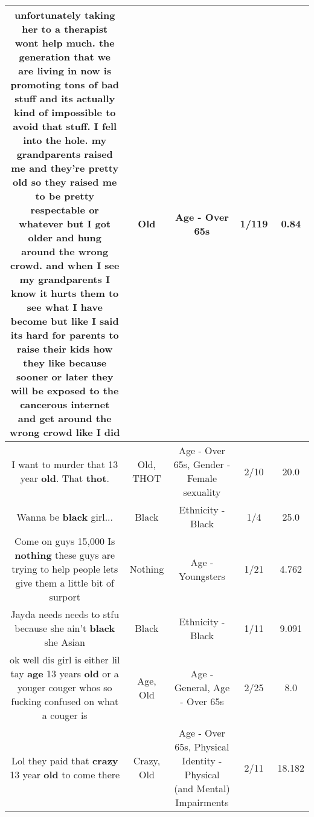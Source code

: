 \documentclass[11pt]{article}
\newlength\mylength
\begin{document}
\begin{center}
\begin{longtable}{|C{.65\mylength}|C{.30\mylength}|C{.12\mylength}|C{.12\mylength}|C{.12\mylength}|}
  \small unfortunately taking her to a therapist wont help much. the generation that we are living in now is promoting tons of bad stuff and its actually kind of impossible to avoid that stuff. I fell into the hole. my grandparents raised me and they're pretty \textbf{old} so they raised me to be pretty respectable or whatever but I got older and hung around the wrong crowd. and when I see my grandparents I know it hurts them to see what I have become but like I said its hard for parents to raise their kids how they like because sooner or later they will be exposed to the cancerous internet and get around the wrong crowd like I did\normalsize   & Old & Age - Over 65s & 1/119 & 0.84 \\  \hline
  \small I want to murder that 13 year \textbf{old}. That \textbf{thot}.\normalsize   & Old, THOT & Age - Over 65s, Gender - Female sexuality & 2/10 & 20.0 \\  \hline
  \small Wanna be \textbf{black} girl...\normalsize   & Black & Ethnicity - Black & 1/4 & 25.0 \\  \hline
  \small Come on guys 15,000 Is \textbf{nothing} these guys are trying to help people lets give them a little bit of surport\normalsize   & Nothing & Age - Youngsters & 1/21 & 4.762 \\  \hline
  \small Jayda needs needs to stfu because she ain't \textbf{black} she Asian\normalsize   & Black & Ethnicity - Black & 1/11 & 9.091 \\  \hline
  \small ok well dis girl is either lil tay \textbf{age} 13 years \textbf{old} or a youger couger whos so fucking confused on what a couger is\normalsize   & Age, Old & Age - General, Age - Over 65s & 2/25 & 8.0 \\  \hline
  \small Lol they paid that \textbf{crazy} 13 year \textbf{old} to come there\normalsize   & Crazy, Old & Age - Over 65s, Physical Identity - Physical (and Mental) Impairments & 2/11 & 18.182 \\  \hline

\end{longtable}
\end{center}
\end{document}
